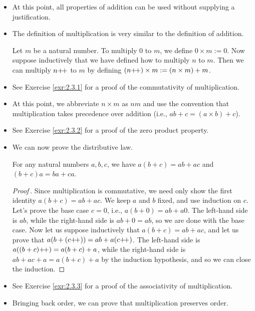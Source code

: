 \documentclass[../main.tex]{subfiles}
\begin{document}
\begin{itemize}
    \item {}At this point, all properties of addition can be used without supplying a justification.
    \item The definition of multiplication is very similar to the definition of addition.
    \begin{dfn}\label{dfn:multiplication}
        Let $m$ be a natural number. To multiply 0 to $m$, we define $0\times m:=0$. Now suppose inductively that we have defined how to multiply $n$ to $m$. Then we can multiply $n{+\!+}$ to $m$ by defining $(n{+\!+})\times m:=(n\times m)+m$. 
    \end{dfn}
    \item See Exercise \ref{exr:2.3.1} for a proof of the commutativity of multiplication.
    \item At this point, we abbreviate $n\times m$ as $nm$ and use the convention that multiplication takes precedence over addition (i.e., $ab+c=(a\times b)+c$).
    \item See Exercise \ref{exr:2.3.2} for a proof of the zero product property.
    \item We can now prove the distributive law.
    \begin{prp}\label{prp:distributive}
        For any natural numbers $a,b,c$, we have $a(b+c)=ab+ac$ and $(b+c)a=ba+ca$.
        \begin{proof}[Proof\,\footnotemark]
            Since multiplication is commutative, we need only show the first identity $a(b+c)=ab+ac$. We keep $a$ and $b$ fixed, and use induction on $c$. Let's prove the base case $c=0$, i.e., $a(b+0)=ab+a0$. The left-hand side is $ab$, while the right-hand side is $ab+0=ab$, so we are done with the base case. Now let us suppose inductively that $a(b+c)=ab+ac$, and let us prove that $a(b+(c{+\!+}))=ab+a(c{+\!+})$. The left-hand side is $a((b+c){+\!+})=a(b+c)+a$, while the right-hand side is $ab+ac+a=a(b+c)+a$ by the induction hypothesis, and so we can close the induction.
        \end{proof}
    \end{prp}
    \item See Exercise \ref{exr:2.3.3} for a proof of the associativity of multiplication.
    \item Bringing back order, we can prove that multiplication preserves order.

\end{itemize}
\end{document}
